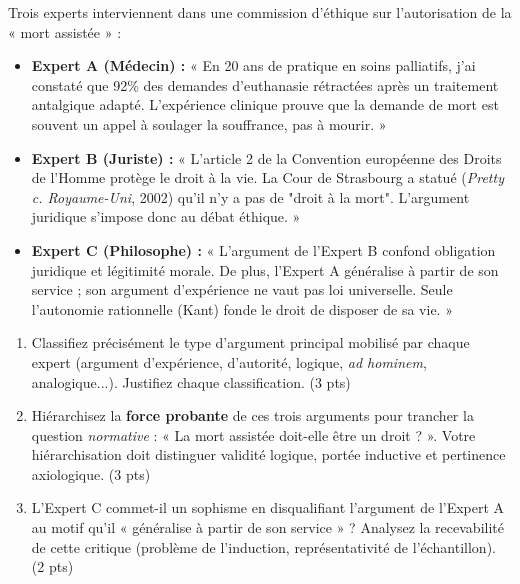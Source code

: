\documentclass[11pt]{article}
\begin{document}
\begin{exercice}
Trois experts interviennent dans une commission d'éthique sur l'autorisation de la « mort assistée » :
\begin{itemize}
    \item \textbf{Expert A (Médecin) :} « En 20 ans de pratique en soins palliatifs, j'ai constaté que 92\% des demandes d'euthanasie rétractées après un traitement antalgique adapté. L'expérience clinique prouve que la demande de mort est souvent un appel à soulager la souffrance, pas à mourir. »
    \item \textbf{Expert B (Juriste) :} « L'article 2 de la Convention européenne des Droits de l'Homme protège le droit à la vie. La Cour de Strasbourg a statué (\textit{Pretty c. Royaume-Uni}, 2002) qu'il n'y a pas de "droit à la mort". L'argument juridique s'impose donc au débat éthique. »
    \item \textbf{Expert C (Philosophe) :} « L'argument de l'Expert B confond obligation juridique et légitimité morale. De plus, l'Expert A généralise à partir de son service ; son argument d'expérience ne vaut pas loi universelle. Seule l'autonomie rationnelle (Kant) fonde le droit de disposer de sa vie. »
\end{itemize}
\begin{enumerate}
    \item Classifiez précisément le type d'argument principal mobilisé par chaque expert (argument d'expérience, d'autorité, logique, \textit{ad hominem}, analogique...). Justifiez chaque classification. (3 pts)
    \item Hiérarchisez la \textbf{force probante} de ces trois arguments pour trancher la question \textit{normative} : « La mort assistée doit-elle être un droit ? ». Votre hiérarchisation doit distinguer validité logique, portée inductive et pertinence axiologique. (3 pts)
    \item L'Expert C commet-il un sophisme en disqualifiant l'argument de l'Expert A au motif qu'il « généralise à partir de son service » ? Analysez la recevabilité de cette critique (problème de l'induction, représentativité de l'échantillon). (2 pts)
\end{enumerate}
\end{exercice}
\end{document}
